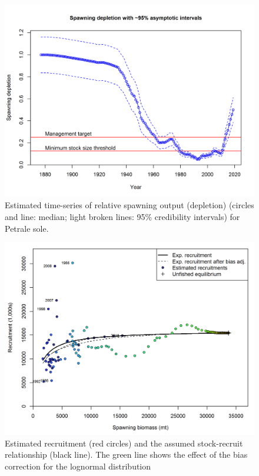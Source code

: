 \documentclass[12pt,]{article}
\begin{document}
\FloatBarrier

\begin{figure}[htbp]
\centering
\includegraphics{r4ss/plots_mod1/ts9_Spawning_depletion_with_95_asymptotic_intervals_intervals.png}
\caption{Estimated time-series of relative spawning output (depletion)
(circles and line: median; light broken lines: 95\% credibility
intervals) for Petrale sole. \label{fig:depl}}
\end{figure}

\FloatBarrier

\begin{figure}[htbp]
\centering
\includegraphics{r4ss/plots_mod1/SR_curve2.png}
\caption{Estimated recruitment (red circles) and the assumed
stock-recruit relationship (black line). The green line shows the effect
of the bias correction for the lognormal distribution
\label{fig:stock_recruit_curve}}
\end{figure}
\end{document}
